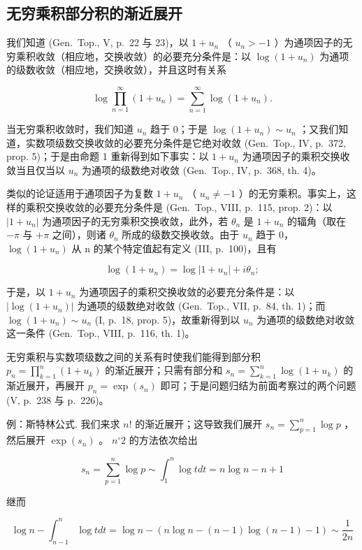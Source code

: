 \subsection{无穷乘积部分积的渐近展开}

我们知道 (Gen.~Top., V, p.~22 与 23)，以 \(1 + u_{n}\) （ \(u_{n} > -1\) ）为通项因子的无穷乘积收敛（相应地，交换收敛）的必要充分条件是：以 \(\log(1 + u_{n})\) 为通项的级数收敛（相应地，交换收敛），并且这时有关系

\[
\log \prod_ {n = 1} ^ {\infty} (1 + u _ {n}) = \sum_ {n = 1} ^ {\infty} \log (1 + u _ {n}).
\]

当无穷乘积收敛时，我们知道 \(u_{n}\) 趋于 0；于是 \(\log(1 + u_{n}) \sim u_{n}\) ；又我们知道，实数项级数交换收敛的必要充分条件是它绝对收敛 (Gen.~Top., IV, p.~372, prop. 5)；于是由命题 1 重新得到如下事实：以 \(1 + u_{n}\) 为通项因子的乘积交换收敛当且仅当以 \(u_{n}\) 为通项的级数绝对收敛 (Gen.~Top., IV, p.~368, th. 4)。

类似的论证适用于通项因子为复数 \(1 + u_{n}\) （ \(u_{n} \neq -1\) ）的无穷乘积。事实上，这样的乘积交换收敛的必要充分条件是 (Gen.~Top., VIII, p.~115, prop. 2)：以 \(|1 + u_{n}|\) 为通项因子的无穷乘积交换收敛，此外，若 \(\theta_{n}\) 是 \(1 + u_{n}\) 的辐角（取在 \(-\pi\) 与 \(+\pi\) 之间），则诸 \(\theta_{n}\) 所成的级数交换收敛。由于 \(u_{n}\) 趋于 0， \(\log(1 + u_{n})\) 从 n 的某个特定值起有定义 (III, p.~100)，且有

\[
\log (1 + u _ {n}) = \log | 1 + u _ {n} | + i \theta_ {n};
\]

于是，以 \(1 + u_{n}\) 为通项因子的乘积交换收敛的必要充分条件是：以 \(|\log(1 + u_{n})|\) 为通项的级数绝对收敛 (Gen.~Top., VII, p.~84, th. 1)；而 \(\log(1 + u_{n}) \sim u_{n}\) (I, p.~18, prop. 5)，故重新得到以 \(u_{n}\) 为通项的级数绝对收敛这一条件 (Gen.~Top., VIII, p.~116, th. 1)。

无穷乘积与实数项级数之间的关系有时使我们能得到部分积 \(p_{n} = \prod_{k=1}^{n}(1 + u_{k})\) 的渐近展开；只需有部分和 \(s_{n} = \sum_{k=1}^{n} \log(1 + u_{k})\) 的渐近展开，再展开 \(p_{n} = \exp(s_{n})\) 即可；于是问题归结为前面考察过的两个问题 (V, p.~238 与 p.~226)。

例：斯特林公式. 我们来求 \(n!\) 的渐近展开；这导致我们展开 \(s_n = \sum_{p=1}^{n} \log p\) ，然后展开 \(\exp(s_n)\) 。 \(n^{\circ} 2\) 的方法依次给出

\[
s _ {n} = \sum_ {p = 1} ^ {n} \log p \sim \int_ {1} ^ {n} \log t d t = n \log n - n + 1
\]

继而

\[
\log n - \int_ {n - 1} ^ {n} \log t d t = \log n - (n \log n - (n - 1) \log (n - 1) - 1) \sim \frac {1}{2 n}
\]

